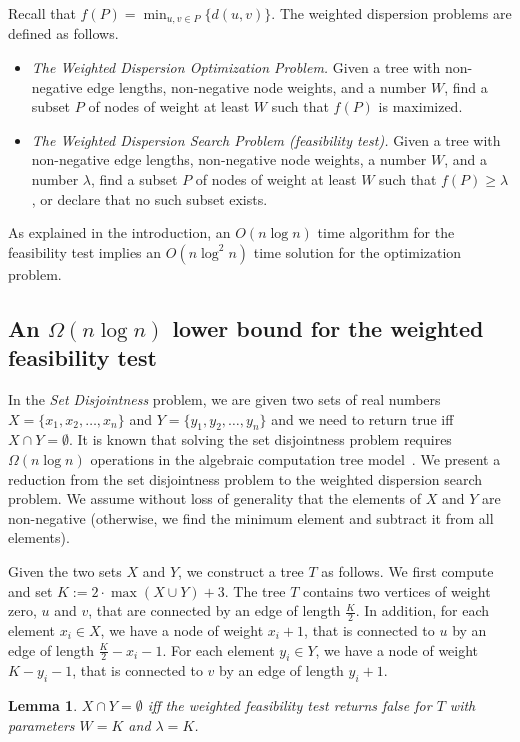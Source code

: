 \documentclass[11pt,a4paper]{article}
\newtheorem{lemma}{Lemma}
\theoremstyle{definition}
\theoremstyle{remark}
\begin{document}
Recall that $f(P)=\min_{u,v\in P}\{d(u,v)\}$. The weighted dispersion problems are defined as follows.
\begin{itemize}
\item  {\em The Weighted Dispersion Optimization Problem.}  Given a tree with non-negative edge lengths, non-negative node weights, and a number $W$, find a subset $P$ of nodes of weight at least $W$ such that  $f(P)$ is maximized. 
\item  {\em The Weighted Dispersion Search Problem (feasibility test).}  Given a tree with non-negative edge lengths, non-negative node weights, a number $W$, and a number $\lambda$, find a subset $P$ of nodes of weight at least $W$ such that  $f(P)\geq\lambda$, or declare that no such subset exists. 
\end{itemize}
As explained in the introduction, an $O(n \log n)$ time algorithm for the feasibility test implies an $O(n\log^{2}n)$ time solution for the optimization problem.
%

\subsection{An \texorpdfstring{\boldmath$ \Omega (n\log n)$}{Omega(nlogn)} lower bound for the weighted feasibility test}\label{weighted f.t. lower bound}

In the {\em Set Disjointness} problem, we are given two sets of real numbers $X=\lbrace x_1,x_2,\ldots,x_n \rbrace$ and $Y=\lbrace y_1,y_2,\ldots,y_n \rbrace$ and we need to return true iff $X \cap Y = \emptyset$. 
It is known that solving the set disjointness problem requires $\Omega(n \log n)$ operations in the algebraic
computation tree model~\cite{BenOr}.
We present a reduction from the set disjointness problem to the weighted dispersion search problem. We assume without loss of generality that the elements of $X$ and $Y$ are non-negative (otherwise,
we find the minimum element and subtract it from all elements).


Given the two sets $X$ and $Y$, we construct a tree $T$ as follows. We first compute and set
$K := 2 \cdot \max (X\cup Y) +3$.
The tree $T$ contains two vertices of weight zero, $u$ and $v$, that are connected by an edge of length $\frac{K}{2}$. In addition, for each element $x_i \in X$, we have a node of weight $x_i+1$, that is connected to $u$ by an edge of length $\frac{K}{2} - x_i -1$. For each element $y_i \in Y$, we have a node of weight $K - y_i -1$, that is connected to $v$ by an edge of length $y_i+1$.
\begin{lemma}\label{lemma of the reduction to set disjointness}
$X \cap Y = \emptyset$ iff the weighted feasibility test returns false for $T$ with  parameters $W=K$ and $\lambda =K$.
\end{lemma}
\end{document}
